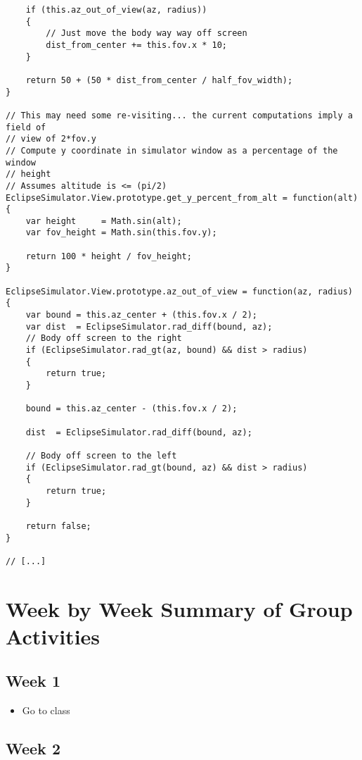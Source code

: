 \documentclass[10pt, onecolumn, draftclsnofoot, letterpaper, compsoc]{IEEEtran}
\begin{document}
\begin{verbatim}
    if (this.az_out_of_view(az, radius))
    {
        // Just move the body way way off screen
        dist_from_center += this.fov.x * 10;
    }

    return 50 + (50 * dist_from_center / half_fov_width);
}

// This may need some re-visiting... the current computations imply a field of
// view of 2*fov.y
// Compute y coordinate in simulator window as a percentage of the window
// height
// Assumes altitude is <= (pi/2)
EclipseSimulator.View.prototype.get_y_percent_from_alt = function(alt)
{
    var height     = Math.sin(alt);
    var fov_height = Math.sin(this.fov.y);

    return 100 * height / fov_height;
}

EclipseSimulator.View.prototype.az_out_of_view = function(az, radius)
{
    var bound = this.az_center + (this.fov.x / 2);
    var dist  = EclipseSimulator.rad_diff(bound, az);
    // Body off screen to the right
    if (EclipseSimulator.rad_gt(az, bound) && dist > radius)
    {
        return true;
    }

    bound = this.az_center - (this.fov.x / 2);

    dist  = EclipseSimulator.rad_diff(bound, az);

    // Body off screen to the left
    if (EclipseSimulator.rad_gt(bound, az) && dist > radius)
    {
        return true;
    }

    return false;
}

// [...]
\end{verbatim}

\section{Week by Week Summary of Group Activities}

\subsection{Week 1}

    \begin{itemize}

    \item Go to class

    \end{itemize}

\subsection{Week 2}
\end{document}
